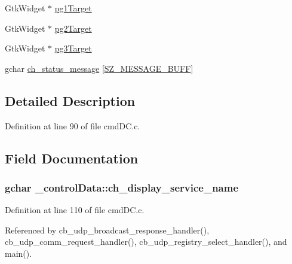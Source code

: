 \begin{DoxyCompactItemize}
\item 
Gtk\+Widget $\ast$ \hyperlink{struct__control_data_adb6c2830054c6309779d676082e94447}{pg1\+Target}
\item 
Gtk\+Widget $\ast$ \hyperlink{struct__control_data_a201f826ab99699df83a85c5e4572ffb2}{pg2\+Target}
\item 
Gtk\+Widget $\ast$ \hyperlink{struct__control_data_a67d45a0e9ba1fcaabea3600dfee830b9}{pg3\+Target}
\item 
gchar \hyperlink{struct__control_data_aa6d5e703090d185edd3e0b5224542ce5}{ch\+\_\+status\+\_\+message} \mbox{[}\hyperlink{gtk_d_s_8c_ab5903aa853c3769389e570c8490feb1e}{S\+Z\+\_\+\+M\+E\+S\+S\+A\+G\+E\+\_\+\+B\+U\+F\+F}\mbox{]}
\end{DoxyCompactItemize}


\subsection{Detailed Description}


Definition at line 90 of file cmd\+D\+C.\+c.



\subsection{Field Documentation}
\hypertarget{struct__control_data_a94aa04264eafaa65a7a869a540bbdf93}{}
\subsubsection[{ch\+\_\+display\+\_\+service\+\_\+name}]{\setlength{\rightskip}{0pt plus 5cm}gchar \+\_\+control\+Data\+::ch\+\_\+display\+\_\+service\+\_\+name}\label{struct__control_data_a94aa04264eafaa65a7a869a540bbdf93}


Definition at line 110 of file cmd\+D\+C.\+c.



Referenced by cb\+\_\+udp\+\_\+broadcast\+\_\+response\+\_\+handler(), cb\+\_\+udp\+\_\+comm\+\_\+request\+\_\+handler(), cb\+\_\+udp\+\_\+registry\+\_\+select\+\_\+handler(), and main().

\hypertarget{struct__control_data_adac6cf5482e4bbabb442f8ab27e4bc62}{}
